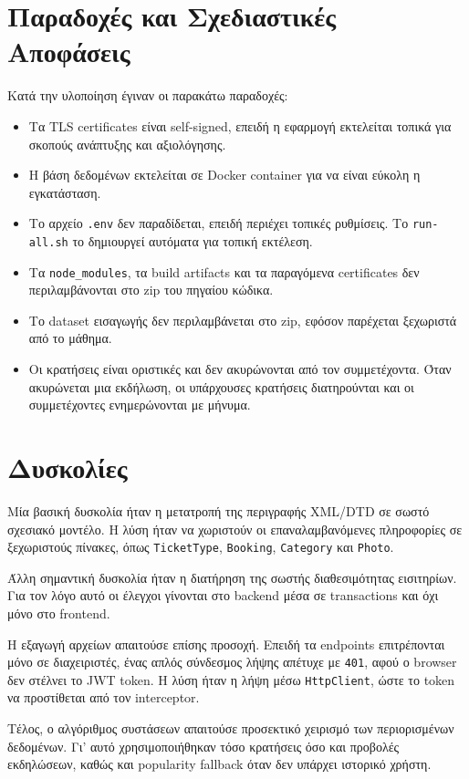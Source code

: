 \documentclass[11pt,a4paper]{article}
\newcommand{\code}[1]{\texttt{#1}}
\begin{document}
\section{Παραδοχές και Σχεδιαστικές Αποφάσεις}

Κατά την υλοποίηση έγιναν οι παρακάτω παραδοχές:
\begin{itemize}
  \item Τα TLS certificates είναι self-signed, επειδή η εφαρμογή εκτελείται τοπικά για
    σκοπούς ανάπτυξης και αξιολόγησης.
  \item Η βάση δεδομένων εκτελείται σε Docker container για να είναι εύκολη η
    εγκατάσταση.
  \item Το αρχείο \code{.env} δεν παραδίδεται, επειδή περιέχει τοπικές ρυθμίσεις. Το
    \code{run-all.sh} το δημιουργεί αυτόματα για τοπική εκτέλεση.
  \item Τα \code{node\_modules}, τα build artifacts και τα παραγόμενα certificates δεν
    περιλαμβάνονται στο zip του πηγαίου κώδικα.
  \item Το dataset εισαγωγής δεν περιλαμβάνεται στο zip, εφόσον παρέχεται ξεχωριστά από
    το μάθημα.
  \item Οι κρατήσεις είναι οριστικές και δεν ακυρώνονται από τον συμμετέχοντα. Όταν
    ακυρώνεται μια εκδήλωση, οι υπάρχουσες κρατήσεις διατηρούνται και οι συμμετέχοντες
    ενημερώνονται με μήνυμα.
\end{itemize}

\section{Δυσκολίες}

Μία βασική δυσκολία ήταν η μετατροπή της περιγραφής XML/DTD σε σωστό σχεσιακό μοντέλο.
Η λύση ήταν να χωριστούν οι επαναλαμβανόμενες πληροφορίες σε ξεχωριστούς πίνακες, όπως
\code{TicketType}, \code{Booking}, \code{Category} και \code{Photo}.

Άλλη σημαντική δυσκολία ήταν η διατήρηση της σωστής διαθεσιμότητας εισιτηρίων. Για τον
λόγο αυτό οι έλεγχοι γίνονται στο backend μέσα σε transactions και όχι μόνο στο frontend.

Η εξαγωγή αρχείων απαιτούσε επίσης προσοχή. Επειδή τα endpoints επιτρέπονται μόνο σε
διαχειριστές, ένας απλός σύνδεσμος λήψης απέτυχε με \code{401}, αφού ο browser δεν
στέλνει το JWT token. Η λύση ήταν η λήψη μέσω \code{HttpClient}, ώστε το token να
προστίθεται από τον interceptor.

Τέλος, ο αλγόριθμος συστάσεων απαιτούσε προσεκτικό χειρισμό των περιορισμένων
δεδομένων. Γι' αυτό χρησιμοποιήθηκαν τόσο κρατήσεις όσο και προβολές εκδηλώσεων, καθώς
και popularity fallback όταν δεν υπάρχει ιστορικό χρήστη.
\end{document}
